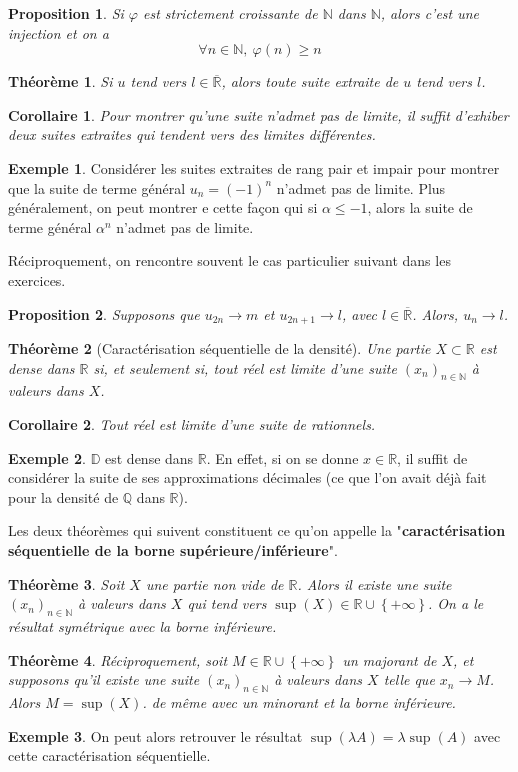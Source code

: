 \documentclass[french]{book}
\newcommand{\N}{\mathbb{N}}
\newcommand{\Q}{\mathbb{Q}}
\newcommand{\R}{\mathbb{R}}
\theoremstyle{plain}
\newtheorem{thm}{Théorème}[chapter]
\newtheorem{prop}{Proposition}[chapter]
\newtheorem{cor}{Corollaire}[chapter]
\theoremstyle{definition}
\newtheorem{exa}{Exemple}[chapter]
\theoremstyle{remark}
\begin{document}
\begin{prop}
	Si $\varphi$ est strictement croissante de $\N$ dans $\N$, alors c'est une injection et on a $$\forall n\in\N,\ \varphi(n)\geqslant n$$
\end{prop}
\begin{thm}
	Si $u$ tend vers $l\in\overline{\R}$, alors toute suite extraite de $u$ tend vers $l$.
\end{thm}
\begin{cor}
	Pour montrer qu'une suite n'admet pas de limite, il suffit d'exhiber deux suites extraites qui tendent vers des limites différentes.
\end{cor}
\begin{exa}
	Considérer les suites extraites de rang pair et impair pour montrer que la suite de terme général $u_n=(-1)^n$ n'admet pas de limite. Plus généralement, on peut montrer e cette façon qui si $\alpha\leqslant-1$, alors la suite de terme général $\alpha^n$ n'admet pas de limite.
\end{exa}
Réciproquement, on rencontre souvent le cas particulier suivant dans les exercices.
\begin{prop}
	Supposons que $u_{2n}\rightarrow m$ et $u_{2n+1}\rightarrow l$, avec $l\in\overline{\R}$. Alors, $u_n\rightarrow l$.
\end{prop}
\begin{thm}[Caractérisation séquentielle de la densité]
	Une partie $X\subset\R$ est dense dans $\R$ si, et seulement si, tout réel est limite d'une suite $(x_n)_{n\in\N}$ à valeurs dans $X$.
\end{thm}
\begin{cor}
	Tout réel est limite d'une suite de rationnels.
\end{cor}
\begin{exa}
	$\mathbb{D}$ est dense dans $\R$. En effet, si on se donne $x\in\R$, il suffit de considérer la suite de ses approximations décimales (ce que l'on avait déjà fait pour la densité de $\Q$ dans $\R$).
\end{exa}
Les deux théorèmes qui suivent constituent ce qu'on appelle la "\textbf{caractérisation séquentielle de la borne supérieure/inférieure}".
\begin{thm}
	Soit $X$ une partie non vide de $\R$. Alors il existe une suite $(x_n)_{n\in\N}$ à valeurs dans $X$ qui tend vers $\sup(X)\in\R\cup\left\{+\infty\right\}$. On a le résultat symétrique avec la borne inférieure.
\end{thm}
\begin{thm}
	Réciproquement, soit $M\in\R\cup\left\{+\infty\right\}$ un majorant de $X$, et supposons qu'il existe une suite $(x_n)_{n\in\N}$ à valeurs dans $X$ telle que $x_n\rightarrow M$. Alors $M=\sup(X)$. de même avec un minorant et la borne inférieure.
\end{thm}
\begin{exa}
	On peut alors retrouver le résultat $\sup(\lambda A)=\lambda\sup(A)$ avec cette caractérisation séquentielle.
\end{exa}
\end{document}

